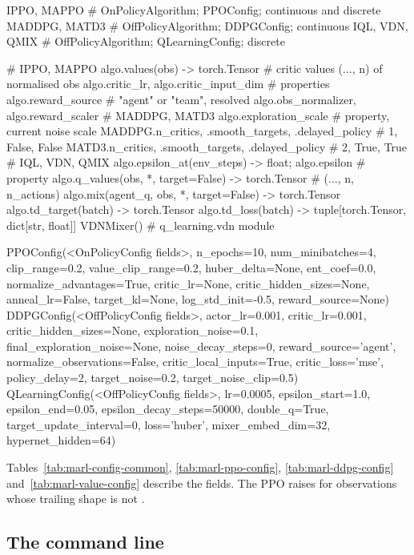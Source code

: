 \begin{pycode}
IPPO, MAPPO            # OnPolicyAlgorithm; PPOConfig; continuous and discrete
MADDPG, MATD3          # OffPolicyAlgorithm; DDPGConfig; continuous
IQL, VDN, QMIX         # OffPolicyAlgorithm; QLearningConfig; discrete

# IPPO, MAPPO
algo.values(obs) -> torch.Tensor     # critic values (..., n) of normalised obs
algo.critic_lr, algo.critic_input_dim                  # properties
algo.reward_source                   # "agent" or "team", resolved
algo.obs_normalizer, algo.reward_scaler
# MADDPG, MATD3
algo.exploration_scale               # property, current noise scale
MADDPG.n_critics, .smooth_targets, .delayed_policy     # 1, False, False
MATD3.n_critics, .smooth_targets, .delayed_policy      # 2, True, True
# IQL, VDN, QMIX
algo.epsilon_at(env_steps) -> float; algo.epsilon      # property
algo.q_values(obs, *, target=False) -> torch.Tensor    # (..., n, n_actions)
algo.mix(agent_q, obs, *, target=False) -> torch.Tensor
algo.td_target(batch) -> torch.Tensor
algo.td_loss(batch) -> tuple[torch.Tensor, dict[str, float]]
VDNMixer()                           # q_learning.vdn module

PPOConfig(<OnPolicyConfig fields>, n_epochs=10, num_minibatches=4,
          clip_range=0.2, value_clip_range=0.2, huber_delta=None,
          ent_coef=0.0, normalize_advantages=True, critic_lr=None,
          critic_hidden_sizes=None, anneal_lr=False, target_kl=None,
          log_std_init=-0.5, reward_source=None)
DDPGConfig(<OffPolicyConfig fields>, actor_lr=0.001, critic_lr=0.001,
           critic_hidden_sizes=None, exploration_noise=0.1,
           final_exploration_noise=None, noise_decay_steps=0,
           reward_source='agent', normalize_observations=False,
           critic_local_inputs=True, critic_loss='mse', policy_delay=2,
           target_noise=0.2, target_noise_clip=0.5)
QLearningConfig(<OffPolicyConfig fields>, lr=0.0005, epsilon_start=1.0,
                epsilon_end=0.05, epsilon_decay_steps=50000, double_q=True,
                target_update_interval=0, loss='huber', mixer_embed_dim=32,
                hypernet_hidden=64)
\end{pycode}

Tables~\ref{tab:marl-config-common}, \ref{tab:marl-ppo-config},
\ref{tab:marl-ddpg-config} and~\ref{tab:marl-value-config} describe the
fields. The PPO  raises  for observations whose
trailing shape is not .

\subsection{The \texorpdfstring{}{marl-train} command line}\label{sec:api-marl-cli}

